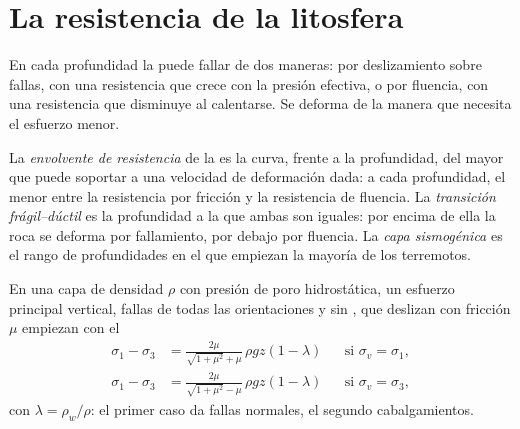 \section{La resistencia de la litosfera}\label{sec:b1:stress-strain-rheology:envelope}

En cada profundidad la  puede fallar de dos maneras: por deslizamiento sobre fallas, con una resistencia que crece con la presión efectiva, o por
fluencia, con una resistencia que disminuye al calentarse. Se deforma de la manera que necesita el esfuerzo menor.

\begin{definition}\label{def:b1:stress-strain-rheology:strength-envelope}
La \emph{envolvente de resistencia} de la  es la curva, frente a la profundidad, del mayor  que puede
soportar a una velocidad de deformación dada: a cada profundidad, el menor entre la resistencia por fricción y la resistencia de fluencia. La
\emph{transición frágil--dúctil} es la profundidad a la que ambas son iguales: por encima de ella la roca se deforma por fallamiento, por
debajo por fluencia. La \emph{capa sismogénica} es el rango de profundidades en el que empiezan la mayoría de los terremotos.
\end{definition}

\begin{proposition}\label{prop:b1:stress-strain-rheology:brittle-gradient}
En una capa de densidad $\rho$ con presión de poro hidrostática, un esfuerzo principal vertical, fallas de todas las orientaciones y sin , que deslizan
con fricción $\mu$ empiezan con el 
\begin{align*}
  \sigma_1 - \sigma_3 &= \frac{2\mu}{\sqrt{1+\mu^2} + \mu}\,\rho g z(1-\lambda)
  && \text{si $\sigma_v = \sigma_1$}, \\
  \sigma_1 - \sigma_3 &= \frac{2\mu}{\sqrt{1+\mu^2} - \mu}\,\rho g z(1-\lambda)
  && \text{si $\sigma_v = \sigma_3$},
\end{align*}
con $\lambda = \rho_w/\rho$: el primer caso da fallas normales, el segundo cabalgamientos.
\end{proposition}

